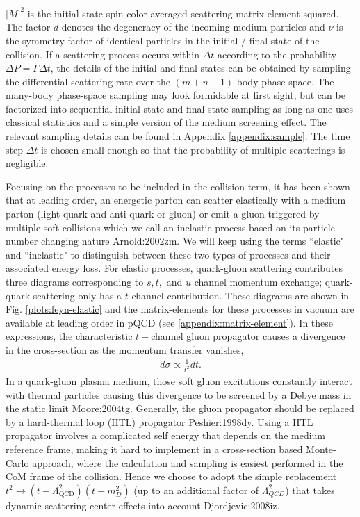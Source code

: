 $\overline{|M|^2}$ is the initial state spin-color averaged scattering matrix-element squared.
The factor $d$ denotes the degeneracy of the incoming medium particles and $\nu$ is the symmetry factor of identical particles in the initial / final state of the collision.
If a scattering process occurs within $\Delta t$ according to the probability $\Delta P=\Gamma \Delta t$, the details of the initial and final states can be obtained by sampling the differential scattering rate over the $(m+n-1)$-body phase space.
The many-body phase-space sampling may look formidable at first sight, but can be factorized into sequential initial-state and final-state sampling as long as one uses classical statistics and a simple version of the medium screening effect.
The relevant sampling details can be found in Appendix \ref{appendix:sample}.
The time step $\Delta t$ is chosen small enough so that the probability of multiple scatterings is negligible. 

Focusing on the processes to be included in the collision term, 
it has been shown that at leading order, an energetic parton can scatter elastically with a medium parton (light quark and anti-quark or gluon) or emit a gluon triggered by multiple soft collisions which we call an inelastic process based on its particle number changing nature {Arnold:2002zm}.
We will keep using the terms ``elastic" and ``inelastic" to distinguish between these two types of processes and their associated energy loss.
For elastic processes, quark-gluon scattering contributes three diagrams corresponding to $s, t,$ and $u$ channel momentum exchange; quark-quark scattering only has a $t$ channel contribution. 
These diagrams are shown in Fig. \ref{plots:feyn-elastic} and the matrix-elements for these processes in vacuum are available at leading order in pQCD (see \ref{appendix:matrix-element}).
In these expressions, the characteristic $t-$channel gluon propagator causes a divergence in the cross-section as the momentum transfer vanishes,
\begin{eqnarray}
d\sigma \propto \frac{1}{t^2} dt.
\end{eqnarray}
In a quark-gluon plasma medium, those soft gluon excitations constantly interact with thermal particles causing this divergence to be screened by a Debye mass in the static limit {Moore:2004tg}.
Generally, the gluon propagator should be replaced by a hard-thermal loop (HTL) propagator {Peshier:1998dy}.
Using a HTL propagator involves a complicated self energy that depends on the medium reference frame, making it hard to implement in a cross-section based Monte-Carlo approach, where the calculation and sampling is easiest performed in the CoM frame of the collision.
Hence we choose to adopt the simple replacement $t^2 \rightarrow (t-\Lambda_{\textrm{QCD}}^2)(t - m_D^2)$ (up to an additional factor of $\Lambda_{QCD}^2$) that takes dynamic scattering center effects into account {Djordjevic:2008iz}.

